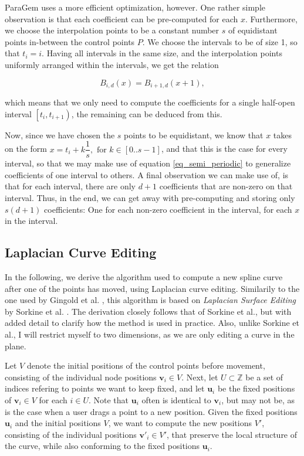\documentclass[english]{article}
\begin{document}
ParaGem uses a more efficient optimization, however. One rather simple observation is that each coefficient can be pre-computed for each $x$. Furthermore, we choose the interpolation points to be a constant number $s$ of equidistant points in-between the control points $P$. We choose the intervals to be of size 1, so that $t_i = i$. Having all intervals in the same size, and the interpolation points uniformly arranged within the intervals, we get the relation

\begin{equation} \label{eq_semi_periodic}
B_{i,d}(x) = B_{i + 1,d}(x + 1),
\end{equation}

which means that we only need to compute the coefficients for a
  single half-open interval $\left[{t_i, t_{i + 1}}\right)$, the remaining can be deduced from this.
    
    Now, since we have chosen the $s$ points to be equidistant, we know that $x$ takes on the form $x = t_i + k \dfrac{1}{s}, \text{ for } k \in [0..{s-1}]$, and that this is the case for every interval, so that we may make use of equation \ref{eq_semi_periodic} to generalize coefficients of one interval to others. A final observation we can make use of, is that for each interval, there are only $d + 1$ coefficients that are non-zero on that interval. Thus, in the end, we can get away with pre-computing and storing only $s(d + 1)$ coefficients: One for each non-zero coefficient in the interval, for each $x$ in the interval.
    

\subsection{Laplacian Curve Editing} \label{section_laplacian}

In the following, we derive the algorithm used to compute a new spline curve after one of the points has moved, using Laplacian curve editing. Similarily to the one used by Gingold et al. \cite{gingold09}, this algorithm is based on \textit{Laplacian Surface Editing} by Sorkine et al. \cite{sorkine04}. The derivation closely follows that of Sorkine et al., but with added detail to clarify how the method is used in practice. Also, unlike Sorkine et al., I will restrict myself to two dimensions, as we are only editing a curve in the plane.

Let $V$ denote the initial positions of the control points before movement, consisting of the individual node positions $\mathbf{v}_i \in V$. Next, let $U \subset \mathbb{Z}$ be a set of indices refering to points we want to keep fixed, and let $\mathbf{u}_i$ be the fixed positions of $\mathbf{v}_i \in V$ for each $ i \in U$. Note that $\mathbf{u}_i$ often is identical to $\mathbf{v}_i$, but may not be, as is the case when a user drags a point to a new position. Given the fixed positions $\mathbf{u}_i$ and the initial positions $V$, we want to compute the new positions $V'$, consisting of the individual positions $\mathbf{v}'_i \in V'$, that preserve the local structure of the curve, while also conforming to the fixed positions $\mathbf{u}_i$.
\end{document}
